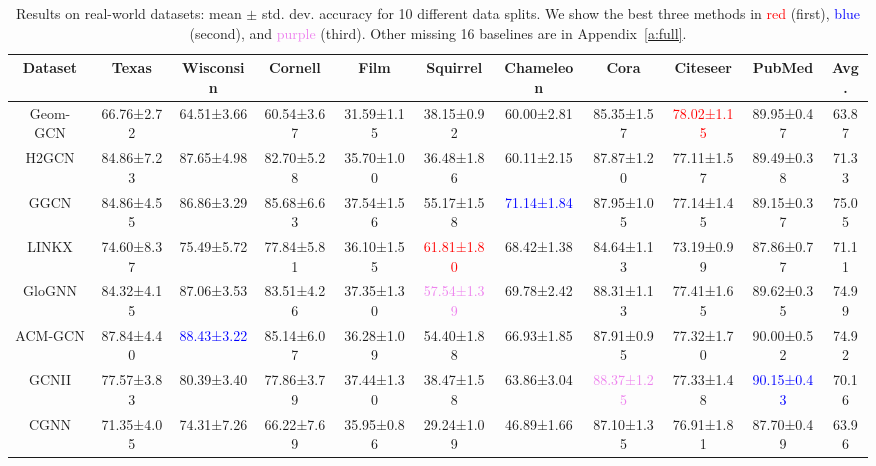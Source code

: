 \documentclass{article}
\theoremstyle{plain}
\theoremstyle{definition}
\theoremstyle{remark}
\newcommand{\std}{\scriptsize{}}
\newcommand{\BEST}[1]{\textcolor{red}{#1}}
\newcommand{\SECOND}[1]{\textcolor{blue}{#1}}
\newcommand{\THIRD}[1]{\textcolor{violet}{#1}}
\begin{document}
\begin{table*}[ht]
    \small
    \centering
    \setlength{\tabcolsep}{2pt}
    \caption{Results on real-world datasets: mean $\pm$ std. dev. accuracy for 10 different data splits. We show the best three methods in \BEST{red} (first), \SECOND{blue} (second), and \THIRD{purple} (third). Other missing 16 baselines are in Appendix~\ref{a:full}.}
\begin{tabular}{c ccccccccc c}\toprule
        Dataset     & Texas      & Wisconsin  & Cornell    & Film       & Squirrel   & Chameleon  & Cora       & Citeseer   & PubMed & Avg.\\ \midrule
Geom-GCN	& 66.76\std{±2.72} & 64.51\std{±3.66} & 60.54\std{±3.67} & 31.59\std{±1.15} & 38.15\std{±0.92} & 60.00\std{±2.81} & 85.35\std{±1.57} & \BEST{78.02\std{±1.15}} & 89.95\std{±0.47} & 63.87\\
        H2GCN	    & 84.86\std{±7.23} & 87.65\std{±4.98} & 82.70\std{±5.28} & 35.70\std{±1.00} & 36.48\std{±1.86} & 60.11\std{±2.15} & 87.87\std{±1.20} & 77.11\std{±1.57} & 89.49\std{±0.38} & 71.33\\
GGCN        & 84.86\std{±4.55} & 86.86\std{±3.29} & 85.68\std{±6.63} & 37.54\std{±1.56} & 55.17\std{±1.58} & \SECOND{71.14\std{±1.84}} & 87.95\std{±1.05} & 77.14\std{±1.45} & 89.15\std{±0.37} & 75.05\\
        LINKX       & 74.60\std{±8.37} & 75.49\std{±5.72} & 77.84\std{±5.81} & 36.10\std{±1.55} & \BEST{61.81\std{±1.80}} & 68.42\std{±1.38} & 84.64\std{±1.13} & 73.19\std{±0.99} & 87.86\std{±0.77} & 71.11\\
        GloGNN      & 84.32\std{±4.15} & 87.06\std{±3.53} & 83.51\std{±4.26} & 37.35\std{±1.30} & \THIRD{57.54\std{±1.39}} & 69.78\std{±2.42} & 88.31\std{±1.13} & 77.41\std{±1.65} & 89.62\std{±0.35} & 74.99\\
        ACM-GCN	    & 87.84\std{±4.40} & \SECOND{88.43\std{±3.22}} & 85.14\std{±6.07} & 36.28\std{±1.09} & 54.40\std{±1.88} & 66.93\std{±1.85} & 87.91\std{±0.95} & 77.32\std{±1.70} & 90.00\std{±0.52} & 74.92\\
        \midrule
GCNII	    & 77.57\std{±3.83} & 80.39\std{±3.40} & 77.86\std{±3.79} & 37.44\std{±1.30} & 38.47\std{±1.58} & 63.86\std{±3.04} & \THIRD{88.37\std{±1.25}} & 77.33\std{±1.48} & \SECOND{90.15\std{±0.43}} & 70.16\\
\midrule
        CGNN	    & 71.35\std{±4.05} & 74.31\std{±7.26} & 66.22\std{±7.69} & 35.95\std{±0.86} & 29.24\std{±1.09} & 46.89\std{±1.66} & 87.10\std{±1.35} & 76.91\std{±1.81} & 87.70\std{±0.49} & 63.96\\

\end{tabular}
\end{table*}
\end{document}

